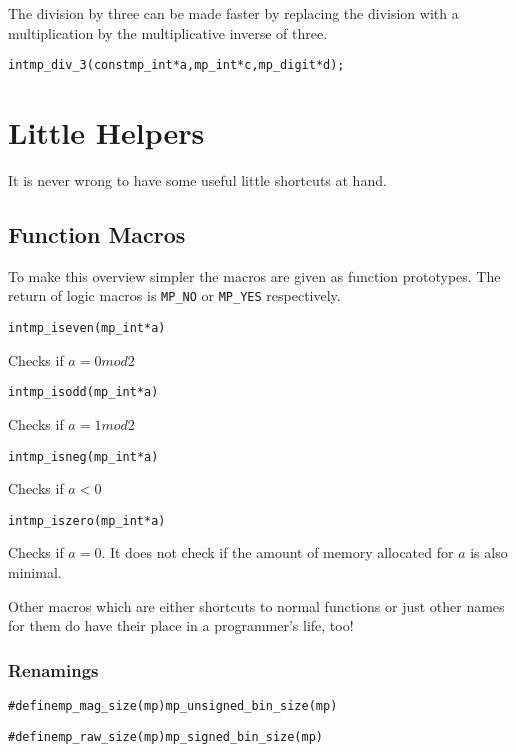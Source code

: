 \documentclass[synpaper]{book}
\begin{document}
The division by three can be made faster by replacing the division with a multiplication by the multiplicative inverse of three.

\begin{alltt}
int mp_div_3(const mp_int *a, mp_int *c, mp_digit *d);
\end{alltt}

\chapter{Little Helpers}
It is never wrong to have some useful little shortcuts at hand.
\section{Function Macros}
To make this overview simpler the macros are given as function prototypes. The return of logic macros is \texttt{MP\_NO} or \texttt{MP\_YES} respectively.

\begin{alltt}
int mp_iseven(mp_int *a)
\end{alltt}
Checks if $a = 0 mod 2$

\begin{alltt}
int mp_isodd(mp_int *a)
\end{alltt}
Checks if $a = 1 mod 2$

\begin{alltt}
int mp_isneg(mp_int *a)
\end{alltt}
Checks if $a < 0$


\begin{alltt}
int mp_iszero(mp_int *a)
\end{alltt}
Checks if $a = 0$. It does not check if the amount of memory allocated for $a$ is also minimal.


Other macros which are either shortcuts to normal functions or just other names for them do have their place in a programmer's life, too!

\subsection{Renamings}
\begin{alltt}
#define mp_mag_size(mp) mp_unsigned_bin_size(mp)
\end{alltt}


\begin{alltt}
#define mp_raw_size(mp) mp_signed_bin_size(mp)
\end{alltt}
\end{document}
